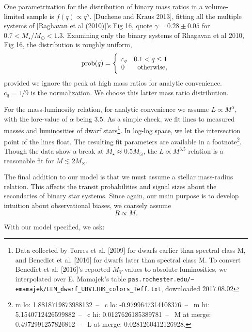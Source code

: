 \documentclass{emulateapj}
\begin{document}
One parametrization for the distribution of 
binary mass ratios in a volume-limited sample is $f(q)\propto q^\gamma$.
[Duchene and Kraus 2013], fitting all the multiple systems of [Raghavan et al 
(2010)]'s Fig 16, quote $\gamma = 0.28\pm0.05$ for $0.7<M_\star/M_\odot<1.3$.
Examining only the binary systems of Rhagavan et al 2010, Fig 16, the 
distribution is roughly uniform,
\begin{equation}
{\rm prob}(q) =
\Bigg\{\begin{array}{lr}
c_q & 0.1 < q \leq 1  \\
0 & {\rm otherwise},
\end{array}
\label{eq:mass_ratio}
\end{equation}
provided we ignore the peak at high mass ratios for analytic convenience. $c_q 
= 1/9$ is the normalization.
We choose this latter mass ratio distribution.

For the mass-luminosity relation, for analytic convenience we assume 
$L \propto M^\alpha$, with the lore-value of $\alpha$ being $3.5$.
As a simple check, we fit lines to measured masses and luminosities of dwarf 
stars\footnote{
    Data collected by Torres et al. [2009] for dwarfs earlier than 
    spectral class M, and Benedict et al. [2016] for dwarfs later than 
    spectral class M.
    To convert Benedict et al. [2016]'s reported $M_V$ values to absolute 
    luminosities, we interpolated over E. Mamajek's 
    table
	\texttt{pas.rochester.edu/\textasciitilde 
		emamajek/EEM\_dwarf\_UBVIJHK\_colors\_Teff.txt},
	downloaded 2017.08.02}.
In log-log space, we let the intersection point of the lines float. The 
resulting fit parameters are available in a footnote\footnote{
	m lo: 1.8818719873988132~--~
	c lo: -0.9799647314108376~--~
	m hi: 5.1540712426599882~--~
	c hi: 0.0127626185389781~--~
	M at merge: 0.4972991257826812~--~
	L at merge: 0.0281260412126928.
}. Though the data show a break at $M_\star \approx 0.5M_\odot$, the 
$L\propto M^{3.5}$ relation is a reasonable fit for $M\lesssim 2M_\odot$.

The final addition to our model is that we must assume a stellar mass-radius 
relation.
This affects the transit probabilities and signal sizes about the 
secondaries of binary star systems.
Since again, our main purpose is to develop intuition about observational 
biases, we coarsely assume
\begin{equation}
R\propto M.
\end{equation}

With our model specified, we ask:
\end{document}
